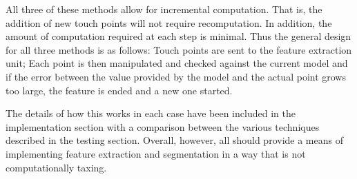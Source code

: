 All three of these methods allow for incremental computation. That is, the addition of new touch points will not require recomputation. In addition, the amount of computation required at each step is minimal. Thus the general design for all three methods is as follows: Touch points are sent to the feature extraction unit; Each point is then manipulated and checked against the current model and if the error between the value provided by the model and the actual point grows too large, the feature is ended and a new one started.

The details of how this works in each case have been included in the implementation section with a comparison between the various techniques described in the testing section. Overall, however, all should provide a means of implementing feature extraction and segmentation in a way that is not computationally taxing.


